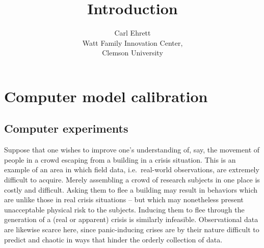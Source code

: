 \documentclass[12pt]{article}
\date{}
\begin{document}
	
%

\def\spacingset#1{\renewcommand{\baselinestretch}%
	{#1}\small\normalsize} \spacingset{1}



\title{\bf Introduction}
\author{Carl Ehrett\\
	Watt Family Innovation Center, \\Clemson University}
\maketitle

\spacingset{2} %

%
%
%	

\section{Computer model calibration}

\subsection{Computer experiments} \label{computer_experiments}

Suppose that one wishes to improve one's understanding of, say, the movement of people in a crowd escaping from a building in a crisis situation. 
This is an example of an area in which field data, i.e.\ real-world observations, are extremely difficult to acquire. 
Merely assembling a crowd of research subjects in one place is costly and difficult. 
Asking them to flee a building may result in behaviors which are unlike those in real crisis situations -- but which may nonetheless present unacceptable physical risk to the subjects. 
Inducing them to flee through the generation of a (real or apparent) crisis is similarly infeasible. 
Observational data are likewise scarce here, since panic-inducing crises are by their nature difficult to predict and chaotic in ways that hinder the orderly collection of data.
\end{document}
